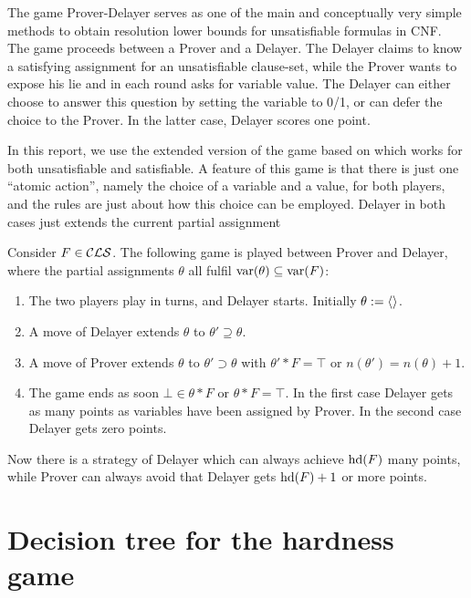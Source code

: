\documentclass[]{book}
\begin{document}
The game Prover-Delayer serves as one of the main and conceptually very simple methods to obtain resolution lower bounds for 
unsatisfiable formulas in CNF. The game proceeds between a Prover and a Delayer. The Delayer claims to know a satisfying
assignment for an unsatisfiable clause-set, while the Prover wants to expose his lie and in each round asks for variable value. 
The Delayer can either choose to answer this question by setting the variable to 0/1, or can defer the choice to the Prover.
In the latter case, Delayer scores one point.
 
In this report, we use the extended version of the game based on \cite{h5} which works for both unsatisfiable and satisfiable. 
A feature of this game is that there is just one “atomic action”, namely the choice of a variable and a value, for both players, 
and the rules are just about how this choice can be employed. Delayer in both cases just extends the current partial assignment

\begin{thm}\label{thm:hd=PI}
  \cite{h5} Consider $F \in \mathcal{CLS}$. The following game is played between Prover and Delayer, where the partial assignments $\theta$ all fulfil $\operatorname{var}(\theta) \subseteq \operatorname{var}(F)$:
  \begin{enumerate}
  \item The two players play in turns, and Delayer starts. Initially $\theta := \langle  \rangle$.
  \item A move of Delayer extends $\theta$ to $\theta' \supseteq \theta$.
  \item A move of Prover extends $\theta$ to $\theta' \supset \theta$ with $\theta' * F = \top$ or $n(\theta') = n(\theta) + 1$.
  \item The game ends as soon $\bot \in \theta * F$ or $\theta * F = \top$.
     In the first case Delayer gets as many points as variables have been assigned by Prover.
     In the second case Delayer gets zero points.
    \end{enumerate}
  Now there is a strategy of Delayer which can always achieve $\operatorname{hd}(F)$ many points, while Prover can always avoid that Delayer gets $\operatorname{hd}(F)+1$ or more points.
\end{thm}
\section{Decision tree for the hardness game}
\label{sec:game-charc}
\end{document}
